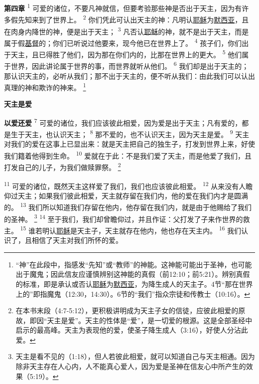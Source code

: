 \textbf{第四章\quad}
\textsuperscript{1}
可爱的诸位，不要凡神就信，但要考验那些神是否出于天主，因为有许多假先知来到了世界上。
\textsuperscript{2}
你们凭此可认出天主的神：凡明认\uline{耶稣}为\uline{默西亚}，且在肉身内降世的神，便是出于天主；
\textsuperscript{3}
凡否认\uline{耶稣}的神，就不是出于天主，而是属于假\uline{基督}的；你们已听说过他要来，现今他已在世界上了。
\textsuperscript{4}
孩子们，你们出于天主，且已得胜了他们，因为那在你们内的，比那在世界上的更大。
\textsuperscript{5}
他们属于世界，因此讲论属于世界的事，而世界就听从他们。
\textsuperscript{6}
我们却是出于天主的；那认识天主的，必听从我们；那不出于天主的，便不听从我们：由此我们可以认出真理的神和欺诈的神来。
\footnote{“神”在此段中，指感发“先知”或“教师”的神能。这神能可能出于圣神，也可能出于魔鬼；因此信友应谨慎辨别这神能的真假（前12:10；前5:21）。辨别真假的标准，即是承认或否认\uline{耶稣}为\uline{默西亚}，为降生成人的天主子。4节“那在世界上的”即指魔鬼（12:30，14:30）。6节的“我们”指众宗徒和传教士（10:16）。}

\begin{center}
	\textbf{\large{\songti 天主是爱}}
\end{center}

\textbf{以爱还爱\quad}
\textsuperscript{7}
可爱的诸位，我们应该彼此相爱，因为爱是出于天主；凡有爱的，都是生于天主，也认识天主；
\textsuperscript{8}
那不爱的，也不认识天主，因为天主是爱。
\textsuperscript{9}
天主对我们的爱在这事上已显出来：就是天主把自己的独生子，打发到世界上来，好使我们籍着他得到生命。
\textsuperscript{10}
爱就在于此：不是我们爱了天主，而是他爱了我们，且打发自己的儿子，为我们做赎罪祭。
\footnote{在本书末段（4:7-5:12），更积极讲明成为天主子女的信徒，应彼此相爱的原故，即因“天主是爱”。天主的性体是“爱”，是一切爱的根源。这是全部圣经中启示的最高峰。天主为表现他的爱，使圣子降生成人（3:16），好使人分沾此爱。}

\textsuperscript{11}
可爱的诸位，既然天主这样爱了我们，我们也应该彼此相爱。
\textsuperscript{12}
从来没有人瞻仰过天主；如果我们彼此相爱，天主就存留在我们内，他的爱在我们内才是圆满的。
\textsuperscript{13}
我们所以知道我们存留在他内，他存留在我们内，就是由于他赐给了我们的圣神。
\footnote{天主是看不见的（1:18），但人若彼此相爱，就可以知道自己与天主相通。因为除非天主存在人心内，人不能真心爱人，因为爱是圣神在信友心中所产生的效果（5:19）。}
\textsuperscript{14}
至于我们，我们却曾瞻仰过，并且作证：父打发了子来作世界的救主。
\textsuperscript{15}
谁若明认\uline{耶稣}是天主子，天主就存在他内，他也存在天主内。
\textsuperscript{16}
我们认识了，且相信了天主对我们所怀的爱。

